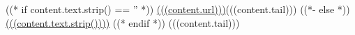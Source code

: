 ((* if content.text.strip() == '' *)) 
\url{(((content.url)))}(((content.tail)))
((*- else *)) \href{(((content.url)))}{(((content.text.strip())))} 
((* endif *)) (((content.tail)))
